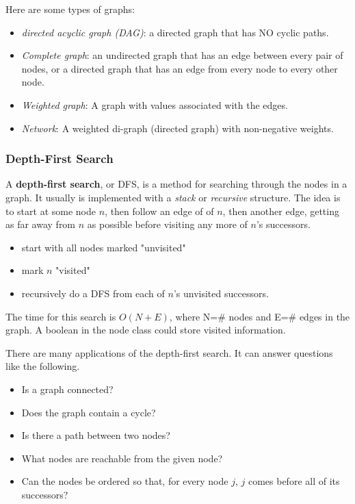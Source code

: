 Here are some types of graphs:
\begin{itemize}
	\item \textit{directed acyclic graph (DAG)}: a directed graph that has NO cyclic paths. 
	\item \textit{Complete graph}: an undirected graph that has an edge between every pair of nodes, or a directed graph that has an edge from every node to every other node. 
	\item \textit{Weighted graph}: A graph with values associated with the edges. 
	\item \textit{Network}: A weighted di-graph (directed graph) with non-negative weights. 
\end{itemize}

\subsubsection{Depth-First Search}

A \textbf{depth-first search}, or DFS, is a method for searching through the nodes in a graph. It usually is implemented with a \textit{stack} or \textit{recursive} structure. The idea is to start at some node $n$, then follow an edge of of $n$, then another edge, getting as far away from $n$ as possible before visiting any more of $n$'s successors. 
\begin{itemize}
	\item start with all nodes marked "unvisited"
	\item mark $n$ "visited"
	\item recursively do a DFS from each of $n$'s unvisited successors. 
\end{itemize}

The time for this search is $O(N+E)$, where N=\# nodes and E=\# edges in the graph. A boolean in the node class could store visited information.

There are many applications of the depth-first search. It can answer questions like the following.
\begin{itemize}
	\item Is a graph connected?
	\item Does the graph contain a cycle?
	\item Is there a path between two nodes?
	\item What nodes are reachable from the given node?
	\item Can the nodes be ordered so that, for every node $j$, $j$ comes before all of its successors?
\end{itemize}

